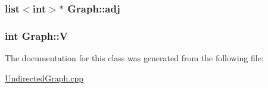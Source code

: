 \subsubsection[{\texorpdfstring{adj}{adj}}]{\setlength{\rightskip}{0pt plus 5cm}list$<$int$>$$\ast$ Graph\+::adj\hspace{0.3cm}{\ttfamily [private]}}\hypertarget{classGraph_a04ab9c17ad31aa036def8db0f88b035b}{}\label{classGraph_a04ab9c17ad31aa036def8db0f88b035b}
\subsubsection[{\texorpdfstring{V}{V}}]{\setlength{\rightskip}{0pt plus 5cm}int Graph\+::V\hspace{0.3cm}{\ttfamily [private]}}\hypertarget{classGraph_a2b722f7cfa7a21e4cb5fae488b3d4dcc}{}\label{classGraph_a2b722f7cfa7a21e4cb5fae488b3d4dcc}


The documentation for this class was generated from the following file\+:\begin{DoxyCompactItemize}
\item 
\hyperlink{UndirectedGraph_8cpp}{Undirected\+Graph.\+cpp}\end{DoxyCompactItemize}
